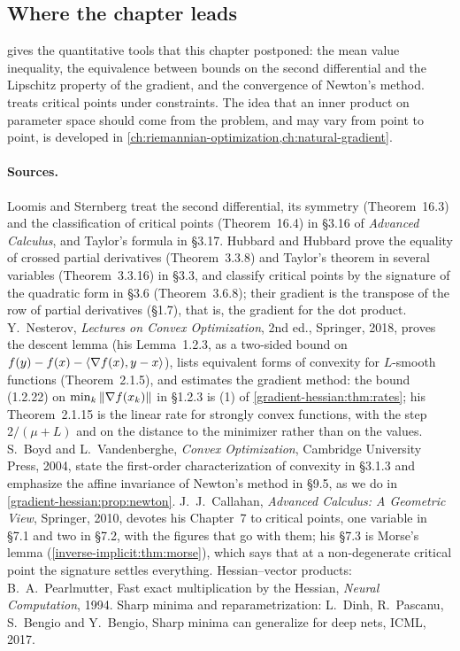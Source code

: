 \begin{notechapter}
\section{Where the chapter leads}\label{gradient-hessian:sec:outlook}

 gives the quantitative tools that this
chapter postponed: the mean value inequality, the equivalence between
bounds on the second differential and the Lipschitz property of the
gradient, and the convergence of Newton's method.
 treats critical points under
constraints. The idea that an inner product on parameter space should
come from the problem, and may vary from point to point, is developed in
\cref{ch:riemannian-optimization,ch:natural-gradient}.

\paragraph{Sources.} Loomis and Sternberg treat the second differential,
its symmetry (Theorem~16.3) and the classification of critical points
(Theorem~16.4) in \S3.16 of \emph{Advanced Calculus}, and Taylor's
formula in \S3.17. Hubbard and Hubbard prove the equality of crossed
partial derivatives (Theorem~3.3.8) and Taylor's theorem in several
variables (Theorem~3.3.16) in \S3.3, and classify critical points by the
signature of the quadratic form in \S3.6 (Theorem~3.6.8); their gradient
is the transpose of the row of partial derivatives (\S1.7), that is, the
gradient for the dot product.
Y.~Nesterov, \emph{Lectures on Convex Optimization}, 2nd ed.,
Springer, 2018, proves the descent lemma (his Lemma~1.2.3, as a
two-sided bound on $f(y) - f(x) - \left\langle \nabla f(x), y - x \right\rangle$), lists
equivalent forms of convexity for $L$-smooth functions
(Theorem~2.1.5), and estimates the gradient method: the bound
(1.2.22) on $\min_k\left\|\nabla f(x_k)\right\|$ in \S1.2.3 is (1) of
\cref{gradient-hessian:thm:rates}; his Theorem~2.1.15 is the linear
rate for strongly convex functions, with the step $2/(\mu + L)$ and on
the distance to the minimizer rather than on the values. S.~Boyd and
L.~Vandenberghe, \emph{Convex Optimization}, Cambridge University
Press, 2004, state the first-order characterization of convexity in
\S3.1.3 and emphasize the affine invariance of Newton's method in
\S9.5, as we do in \cref{gradient-hessian:prop:newton}.
J.~J.~Callahan, \emph{Advanced Calculus: A Geometric View}, Springer,
2010, devotes his Chapter~7 to critical points, one variable in \S7.1
and two in \S7.2, with the figures that go with them; his \S7.3 is
Morse's lemma (\cref{inverse-implicit:thm:morse}), which says that at a
non-degenerate critical point the signature settles everything.
Hessian--vector products: B.~A.~Pearlmutter, Fast exact multiplication
by the Hessian, \emph{Neural Computation}, 1994. Sharp minima and
reparametrization: L.~Dinh, R.~Pascanu, S.~Bengio and Y.~Bengio, Sharp
minima can generalize for deep nets, ICML, 2017.


\end{notechapter}
